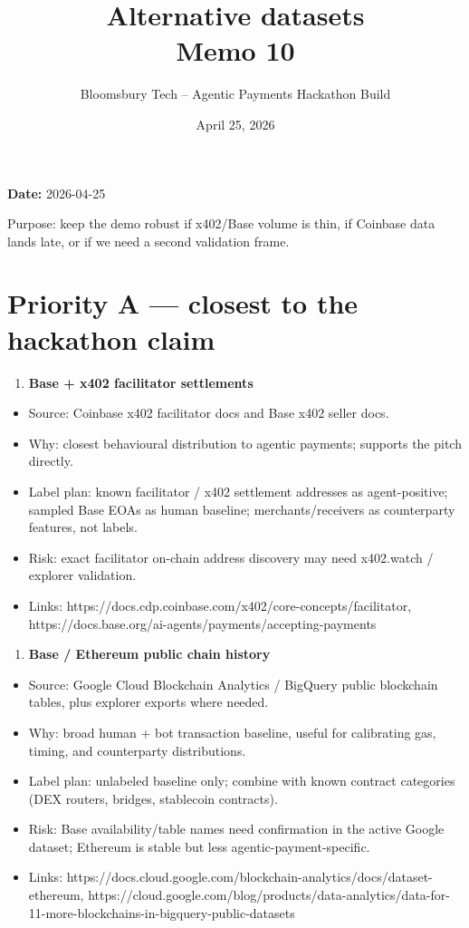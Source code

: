 \documentclass[11pt]{article}
\title{\textbf{Alternative datasets}\\
\large Memo 10}
\author{Bloomsbury Tech -- Agentic Payments Hackathon Build}
\date{April 25, 2026}
\begin{document}
\maketitle

\textbf{Date:} 2026-04-25

Purpose: keep the demo robust if x402/Base volume is thin, if Coinbase data lands late, or if we need a second validation frame.

\section{Priority A --- closest to the hackathon claim}
\begin{enumerate}
  \item \textbf{Base + x402 facilitator settlements}
\end{enumerate}
\begin{itemize}
  \item Source: Coinbase x402 facilitator docs and Base x402 seller docs.
  \item Why: closest behavioural distribution to agentic payments; supports the pitch directly.
  \item Label plan: known facilitator / x402 settlement addresses as agent-positive; sampled Base EOAs as human baseline; merchants/receivers as counterparty features, not labels.
  \item Risk: exact facilitator on-chain address discovery may need x402.watch / explorer validation.
  \item Links: https://docs.cdp.coinbase.com/x402/core-concepts/facilitator, https://docs.base.org/ai-agents/payments/accepting-payments
\end{itemize}
\begin{enumerate}
  \item \textbf{Base / Ethereum public chain history}
\end{enumerate}
\begin{itemize}
  \item Source: Google Cloud Blockchain Analytics / BigQuery public blockchain tables, plus explorer exports where needed.
  \item Why: broad human + bot transaction baseline, useful for calibrating gas, timing, and counterparty distributions.
  \item Label plan: unlabeled baseline only; combine with known contract categories (DEX routers, bridges, stablecoin contracts).
  \item Risk: Base availability/table names need confirmation in the active Google dataset; Ethereum is stable but less agentic-payment-specific.
  \item Links: https://docs.cloud.google.com/blockchain-analytics/docs/dataset-ethereum, https://cloud.google.com/blog/products/data-analytics/data-for-11-more-blockchains-in-bigquery-public-datasets
\end{itemize}
\end{document}
